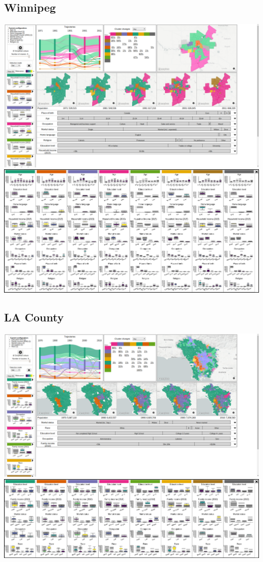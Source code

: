 \documentclass[a4paper]{article}
\begin{document}
\subsection{Winnipeg}
\begin{center}
	\includegraphics[width=\linewidth]{9a.png}
	\includegraphics[width=\linewidth]{9b.png}
\end{center}



\subsection{LA County}
\begin{center}
	\includegraphics[width=\linewidth]{10a.png}
	\includegraphics[width=\linewidth]{10b.png}
\end{center}
\clearpage
\end{document}
